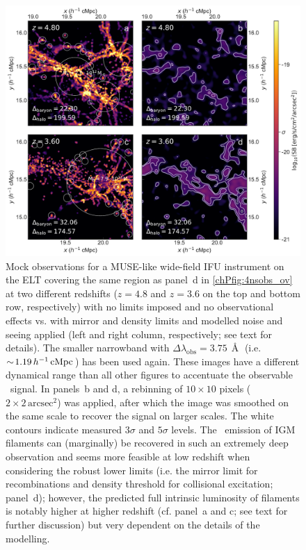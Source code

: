 \begin{figure}
    \centering
    \includegraphics[width=\linewidth]{"Plots/ChapterP/IFU_mock_observations"}
    \caption[Observed \lya\ surface brightness at $z=4.8$.]
    {Mock observations for a MUSE-like wide-field IFU instrument on the ELT covering the same region as panel~d in \cref{chPfig:4nsobs_ov} at two different redshifts ($z=4.8$ and $z=3.6$ on the top and bottom row, respectively) with no limits imposed and no observational effects vs. with mirror and density limits and modelled noise and seeing applied (left and right column, respectively; see text for details). The smaller narrowband with $\Delta \lambda_\text{obs} = 3.75 \, \Angstrom$ (i.e. $\sim \! 1.19 \, h^{-1} \, \mathrm{cMpc}$) has been used again. These images have a different dynamical range than all other figures to accentuate the observable \lya\ signal. In panels~b and d, a rebinning of $10 \times 10$ pixels ($2 \times 2 \, \mathrm{arcsec}^2$) was applied, after which the image was smoothed on the same scale to recover the signal on larger scales. The white contours indicate measured $3 \sigma$ and $5 \sigma$ levels. The \lya\ emission of IGM filaments can (marginally) be recovered in such an extremely deep observation and seems more feasible at low redshift when considering the robust lower limits (i.e. the mirror limit for recombinations and density threshold for collisional excitation; panel~d); however, the predicted full intrinsic luminosity of filaments is notably higher at higher redshift (cf. panel~a and c; see text for further discussion) but very dependent on the details of the modelling.}
    \label{chPfig:4nsobs_ov150}
\end{figure}

